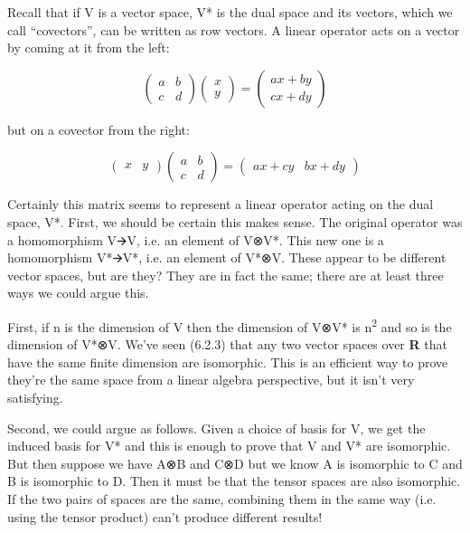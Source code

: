 \documentclass[oneside,english]{amsbook}
\numberwithin{section}{chapter}
\theoremstyle{plain}
\theoremstyle{definition}
\begin{document}
Recall that if V is a vector space, V* is the dual space and its
vectors, which we call ``covectors'', can be written as row vectors. A
linear operator acts on a vector by coming at it from the left:

\[\begin{pmatrix}
	a & b \\
	c & d
\end{pmatrix}\begin{pmatrix}
	x \\
	y
\end{pmatrix} = \begin{pmatrix}
	ax + by \\
	cx + dy
\end{pmatrix}\]

but on a covector from the right:

\[\begin{pmatrix}
	x & y
\end{pmatrix}\begin{pmatrix}
	a & b \\
	c & d
\end{pmatrix} = \begin{pmatrix}
	ax + cy & bx + dy
\end{pmatrix}\]

Certainly this matrix seems to represent a linear operator acting on the
dual space, V*. First, we should be certain this makes sense. The
original operator was a homomorphism V🡪V, i.e. an element of V⊗V*. This
new one is a homomorphism V*🡪V*, i.e. an element of V*⊗V. These appear
to be different vector spaces, but are they? They are in fact the same;
there are at least three ways we could argue this.

First, if n is the dimension of V then the dimension of V⊗V* is
n\textsuperscript{2} and so is the dimension of V*⊗V. We've seen (6.2.3)
that any two vector spaces over \textbf{R} that have the same finite
dimension are isomorphic. This is an efficient way to prove they're the
same space from a linear algebra perspective, but it isn't very
satisfying.

Second, we could argue as follows. Given a choice of basis for V, we get
the induced basis for V* and this is enough to prove that V and V* are
isomorphic. But then suppose we have A⊗B and C⊗D but we know A is
isomorphic to C and B is isomorphic to D. Then it must be that the
tensor spaces are also isomorphic. If the two pairs of spaces are the
same, combining them in the same way (i.e. using the tensor product)
can't produce different results!
\end{document}
